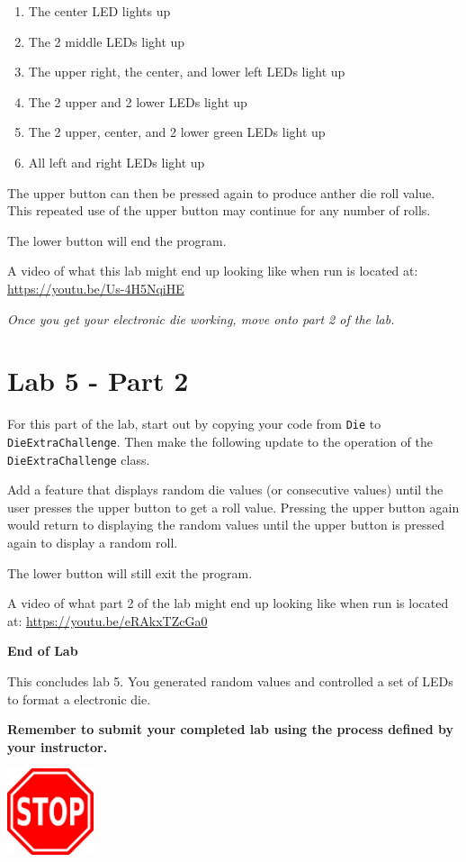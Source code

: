 \begin{enumerate}
	\item The center LED lights up
	\item The 2 middle LEDs light up
	\item The upper right, the center, and lower left LEDs light up
	\item The 2 upper and 2 lower LEDs light up
	\item The 2 upper, center, and 2 lower green LEDs light up
	\item All left and right LEDs light up
\end{enumerate}

The upper button can then be pressed again to produce anther die roll value. This repeated use of the upper button may continue for any number of rolls. 

The lower button will end the program.

A video of what this lab might end up looking like when run is located at: \url{https://youtu.be/Us-4H5NqiHE}

\textit{Once you get your electronic die working, move onto part 2 of the lab.}

\section{Lab 5 - Part 2}

For this part of the lab, start out by copying your code from \texttt{Die} to \texttt{DieExtraChallenge}. Then make the following update to the operation of the \texttt{DieExtraChallenge} class.

Add a feature that displays random die values (or consecutive values) until the user presses the upper button to get a roll value. Pressing the upper button again would return to displaying the random values until the upper button is pressed again to display a random roll.

The lower button will still exit the program.

A video of what part 2 of the lab might end up looking like when run is located at: \url{https://youtu.be/eRAkxTZcGa0}
 
\textbf{End of Lab}
  
This concludes lab 5. You generated random values and controlled a set of LEDs to format a electronic die.

\textbf{Remember to submit your completed lab using the process defined by your instructor.}

{\centering
	\beforefig
	\centerline{\includegraphics[height=1in]{pi_images/stop_sign_clip_art_16252.jpg}}
	\afterfig
}

